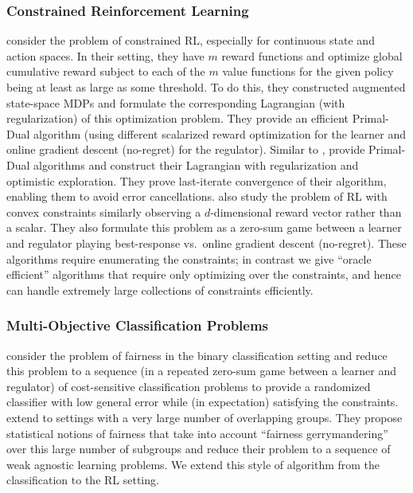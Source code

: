 \subsubsection{Constrained Reinforcement Learning}
\citet{calvo2023state} consider the problem of constrained RL, especially for continuous state and action spaces. In their setting, they have $m$ reward functions and optimize global cumulative reward subject to each of the $m$ value functions for the given policy being at least as large as some threshold. To do this, they constructed augmented state-space MDPs and formulate the corresponding Lagrangian (with regularization) of this optimization problem. They provide an efficient Primal-Dual algorithm (using different scalarized reward optimization for the learner and online gradient descent (no-regret) for the regulator).  Similar to \citeauthor{calvo2023state}, \citet{muller2024truly} provide Primal-Dual algorithms and construct their Lagrangian with regularization and optimistic exploration. They prove last-iterate convergence of their algorithm, enabling them to avoid error cancellations. 
\citet{miryoosefi2019reinforcement} also study the problem of RL with convex constraints similarly observing a $d$-dimensional reward vector rather than a scalar. They also formulate this problem as a zero-sum game between a learner and regulator playing best-response vs.~online gradient descent (no-regret). These algorithms require enumerating the constraints; in contrast we give ``oracle efficient'' algorithms that require only optimizing over the constraints, and hence can handle extremely large collections of constraints efficiently.
\subsubsection{Multi-Objective Classification Problems}
\citet{agarwal2018reductions} consider the problem of fairness in the binary classification setting and reduce this problem to a sequence (in a repeated zero-sum game between a learner and regulator) of cost-sensitive classification problems to provide a randomized classifier with low general error while (in expectation) satisfying the constraints. \citet{kearns2018preventing} extend \citet{agarwal2018reductions} to settings with a very large number  of overlapping groups. They propose statistical notions of fairness that take into account ``fairness gerrymandering'' over this large number of subgroups and reduce their problem to a sequence of weak agnostic learning problems. We extend this style of algorithm from the classification to the RL setting.
